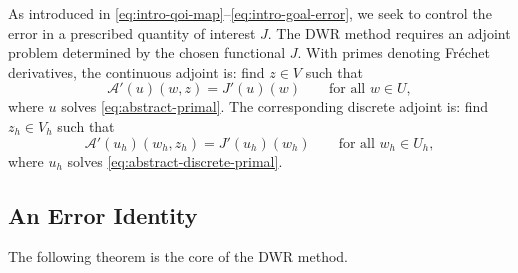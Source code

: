 As introduced in \eqref{eq:intro-qoi-map}--\eqref{eq:intro-goal-error}, we seek to control the error in a prescribed quantity of interest $J$. %
The DWR method requires an adjoint problem determined by the chosen functional \(J\). With primes denoting Fr\'echet derivatives, the continuous adjoint is: find \(z\in V\) such that
\begin{equation}
  \mathcal{A}'(u)(w,z)=J'(u)(w)
  \qquad\text{for all }w\in U,
  \label{eq:nonlinear-adjoint}
\end{equation}
where \(u\) solves \eqref{eq:abstract-primal}. The corresponding discrete adjoint is: find \(z_h\in V_h\) such that
\begin{equation}
  \mathcal{A}'(u_h)(w_h,z_h)=J'(u_h)(w_h)
  \qquad\text{for all }w_h\in U_h,
  \label{eq:discrete-nonlinear-adjoint}
\end{equation}
where \(u_h\) solves \eqref{eq:abstract-discrete-primal}.


\subsection{An Error Identity}
\label{subsec:nonlinear-dwr}

The following theorem is the core of the DWR method.

